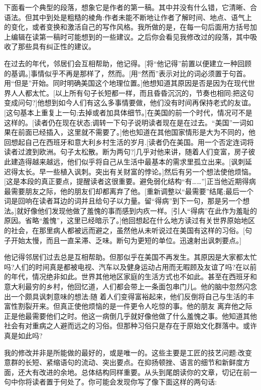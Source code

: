下面看一个典型的段落，想象它是作者的第一稿。其中并没有什么错，它清晰、合语法。但其中到处是粗糙的棱角:作者未能不断地让作者了解时间、地点、语气上的变化，或者变换和激活自己的写作风格。我所做的是，在每一句后面用方括号加上编辑在读第一稿时可能想到的一些建议。之后你会看见我修改过的段落，其中吸收了那些具有纠正性的建议。

在过去的年代，邻居们会互相帮助，他记得。[将“他记得”前置以便建立一种回顾的基调。]事情似乎不再是那样了，然而。[用“然而”表示对比的词必须置于句首。用“但是”开始。同时明确美国这个地理位置。]他想知道其原因是否是因为在现代世界人人都太忙。[以上所有句子长短都一样，而且昏昏沉沉的，节奏也相同;把这句变成问句?]他想到如今人们有这么多事情要做，他们没有时间再保持老式的友谊。[这句基本上重复上一句;去掉或者加具体细节。]在美国的前一个时代，情况可不是这样的。[读者仍在现在状态;调转一下句子说明读者现在是在过去。“美国”一词如果在前面已经插入，这里就不需要了。]他也知道在其他国家情形是大为不同的，他回想起自己在西班牙和意大利乡村生活的岁月.[读者仍在美国。用一个否定连词将读者过渡到欧洲。句子太松散。断为两句?]几乎对他来讲，随着人们变富，房子彼此建造得越来越远，他们似乎将自己从生活中最基本的需求里孤立出来。[讽刺延迟得太长。早一些植入讽刺。突出有关财富的悖论。]然后有另一个想法使他烦恼。[这是本段的真正要点，提醒读者这很重要。避免弱化结构“有……”]正当他近期得病最需要朋友之际，他的朋友们却都离弃了他。[重新调整以“最需要”结尾;最后一个词是回响在读者耳边的词并且给句子以力量。留“得病”到下一句，那是另一个想法。]就好像他们发现他做了羞愧的事而感到内疚一样。[引人“得病”在此作为羞耻的原因。省略“羞愧”，这里已经暗示了。]他回想起在什么地方读过有关世界原始地区的社会，在那里病人都被远而避之，虽然他从未听说过在美国有这样的习俗。[句子开始太慢，而且一直呆滞、乏味。断句为更短的单位。迅速射出讽刺要点。]

他记得邻居们过去总是互相帮助。但那似乎在美国不再发生。其原因是大家都太忙吗?人们的时间真是都被电视、汽车以及健身运动占用而无暇顾及友谊了吗?在以前的年代，情况绝非如此。世界其他地区家庭的生活方式也不如此。甚至在西班牙和意大利最穷的乡村，他回忆道，人们都会带上一条面包串门儿。他的脑中忽然闪念出一个颇具讽刺意味的想法:随 着人们变得富裕起来，他们反倒将自己与生活的丰富性割裂开来。但真正使他烦恼的是一件更令人吃惊的事。他的朋友 离弃他之际正是他最需要他们之时。他这一病倒几乎就好像他做了什么羞愧之事。他知道其他社会有对重病之人避而远之的习俗。但那种习俗只是存在于原始文化群落中。或许真是如此吗?

我的修改并非是所能做的最好的，或是唯一的。这些主要是工匠的技艺问题:改变意群的长短、紧缩语句的流动、突出要点。在抑扬顿挫、语言的细节和新鲜度方面，还大有改进的余地。总体结构同样重要。从头到尾朗读你的文章，切记在前一句中你将读者置于何处了。你可能会发现你写了像下面这样的两句话:

